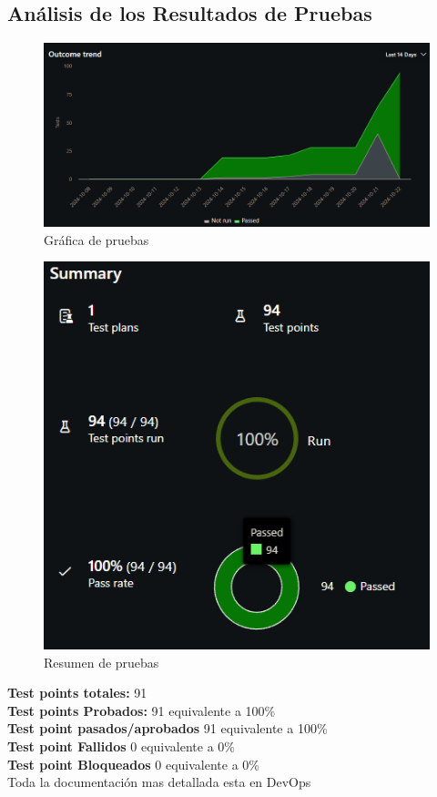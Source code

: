 \documentclass[12pt,letterpaper]{article}
\begin{document}
    \subsection{Análisis de los Resultados de Pruebas}
    \begin{figure}[H]
        \centering
        \includegraphics[width=1\linewidth]{grafica.png}
        \caption{Gráfica de pruebas}
    \end{figure}

    \begin{figure}[H]
        \centering
        \includegraphics[width=0.5\linewidth]{resumen.png}
        \caption{Resumen de pruebas}
    \end{figure}
    \textbf{Test points totales:} 91\\
    \textbf{Test points Probados:} 91 equivalente a 100\%\\
    \textbf{Test point pasados/aprobados} 91 equivalente a 100\%\\
    \textbf{Test point Fallidos} 0 equivalente a 0\%\\
    \textbf{Test point Bloqueados} 0 equivalente a 0\%\\


    
    Toda la documentación mas detallada esta en DevOps
    
\end{document}
